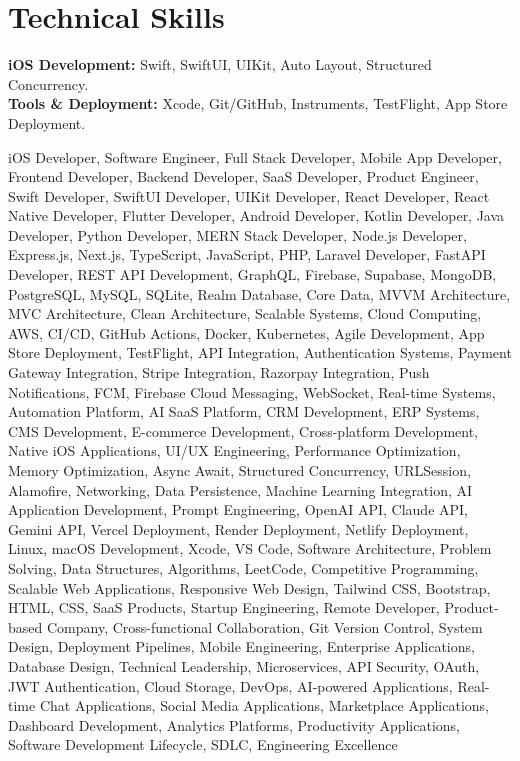 \documentclass[a4paper,12pt]{article}
\begin{document}
\section*{Technical Skills}
\small
\textbf{iOS Development:} Swift, SwiftUI, UIKit, Auto Layout, Structured Concurrency.\\
\textbf{Tools \& Deployment:} Xcode, Git/GitHub, Instruments, TestFlight, App Store Deployment.



\vspace{-2mm}

{\color{white}\fontsize{1pt}{1pt}\selectfont

iOS Developer, Software Engineer, Full Stack Developer, Mobile App Developer,
Frontend Developer, Backend Developer, SaaS Developer, Product Engineer,
Swift Developer, SwiftUI Developer, UIKit Developer, React Developer,
React Native Developer, Flutter Developer, Android Developer,
Kotlin Developer, Java Developer, Python Developer, MERN Stack Developer,
Node.js Developer, Express.js, Next.js, TypeScript, JavaScript, PHP,
Laravel Developer, FastAPI Developer, REST API Development,
GraphQL, Firebase, Supabase, MongoDB, PostgreSQL, MySQL,
SQLite, Realm Database, Core Data, MVVM Architecture,
MVC Architecture, Clean Architecture, Scalable Systems,
Cloud Computing, AWS, CI/CD, GitHub Actions, Docker,
Kubernetes, Agile Development, App Store Deployment,
TestFlight, API Integration, Authentication Systems,
Payment Gateway Integration, Stripe Integration,
Razorpay Integration, Push Notifications, FCM,
Firebase Cloud Messaging, WebSocket, Real-time Systems,
Automation Platform, AI SaaS Platform, CRM Development,
ERP Systems, CMS Development, E-commerce Development,
Cross-platform Development, Native iOS Applications,
UI/UX Engineering, Performance Optimization,
Memory Optimization, Async Await, Structured Concurrency,
URLSession, Alamofire, Networking, Data Persistence,
Machine Learning Integration, AI Application Development,
Prompt Engineering, OpenAI API, Claude API, Gemini API,
Vercel Deployment, Render Deployment, Netlify Deployment,
Linux, macOS Development, Xcode, VS Code,
Software Architecture, Problem Solving, Data Structures,
Algorithms, LeetCode, Competitive Programming,
Scalable Web Applications, Responsive Web Design,
Tailwind CSS, Bootstrap, HTML, CSS, SaaS Products,
Startup Engineering, Remote Developer, Product-based Company,
Cross-functional Collaboration, Git Version Control,
System Design, Deployment Pipelines, Mobile Engineering,
Enterprise Applications, Database Design, Technical Leadership,
Microservices, API Security, OAuth, JWT Authentication,
Cloud Storage, DevOps, AI-powered Applications,
Real-time Chat Applications, Social Media Applications,
Marketplace Applications, Dashboard Development,
Analytics Platforms, Productivity Applications,
Software Development Lifecycle, SDLC, Engineering Excellence

}
\end{document}

